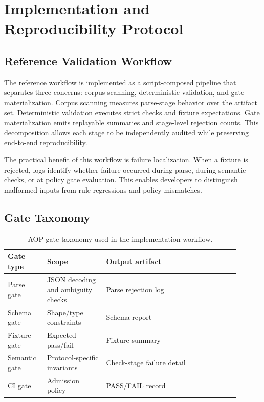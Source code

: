 \documentclass[10pt,conference]{IEEEtran}
\begin{document}
\section{Implementation and Reproducibility Protocol}

\subsection{Reference Validation Workflow}

The reference workflow is implemented as a script-composed pipeline that
separates three concerns: corpus scanning, deterministic validation, and gate
materialization. Corpus scanning measures parse-stage behavior over the
artifact set. Deterministic validation executes strict checks and fixture
expectations. Gate materialization emits replayable summaries and stage-level
rejection counts. This decomposition allows each stage to be independently
audited while preserving end-to-end reproducibility.

The practical benefit of this workflow is failure localization. When a fixture
is rejected, logs identify whether failure occurred during parse, during
semantic checks, or at policy gate evaluation. This enables developers to
distinguish malformed inputs from rule regressions and policy mismatches.

\subsection{Gate Taxonomy}

\begin{table}[t]
\centering
\caption{AOP gate taxonomy used in the implementation workflow.}
{\small
\setlength{\tabcolsep}{3pt}
\begin{tabular}{@{}p{0.15\linewidth}p{0.23\linewidth}p{0.52\linewidth}@{}}
\toprule
Gate type & Scope & Output artifact \\
\midrule
Parse gate & JSON decoding and ambiguity checks & Parse rejection log \\
Schema gate & Shape/type constraints & Schema report \\
Fixture gate & Expected pass/fail & Fixture summary \\
Semantic gate & Protocol-specific invariants & Check-stage failure detail \\
CI gate & Admission policy & PASS/FAIL record \\
\bottomrule
\end{tabular}
}
\end{table}
\end{document}
